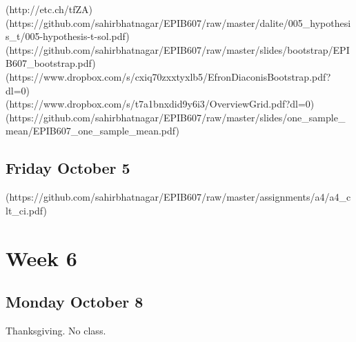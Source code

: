 \documentclass[]{book}
\let\originaltabular\tabular
\let\endoriginaltabular\endtabular
\renewenvironment{tabular}[1]{%
  \begingroup%
  \centering%
  \originaltabular{#1}}%
  {\endoriginaltabular\endgroup}
\theoremstyle{definition}
\theoremstyle{definition}
\theoremstyle{definition}
\theoremstyle{remark}
\begin{document}
\begin{table}[H]
\centering
\begin{tabular}{l}
(http://etc.ch/tfZA)\\
\hline
[2. DALITE Q5](https://github.com/sahirbhatnagar/EPIB607/raw/master/dalite/005\_hypothesis\_t/005-hypothesis-t-sol.pdf)\\
(https://github.com/sahirbhatnagar/EPIB607/raw/master/slides/bootstrap/EPIB607\_bootstrap.pdf)\\
(https://www.dropbox.com/s/cxiq70zxxtyxlb5/EfronDiaconisBootstrap.pdf?dl=0)\\
(https://www.dropbox.com/s/t7a1bnxdid9y6i3/OverviewGrid.pdf?dl=0)\\
(https://github.com/sahirbhatnagar/EPIB607/raw/master/slides/one\_sample\_mean/EPIB607\_one\_sample\_mean.pdf)\\
\hline
\end{tabular}
\end{table}

\subsection{Friday October 5}\label{friday-october-5}

\begin{table}[H]
\centering
\begin{tabular}{l}
\hline
[A4 due by 11:59pm](https://github.com/sahirbhatnagar/EPIB607/raw/master/assignments/a4/a4\_clt\_ci.pdf)\\
\hline
\end{tabular}
\end{table}

\section{Week 6}\label{week-6}

\subsection{Monday October 8}\label{monday-october-8}

\begin{table}[H]
\centering
\begin{tabular}{l}
\hline
Thanksgiving. No class.\\
\hline
\end{tabular}
\end{table}
\end{document}
